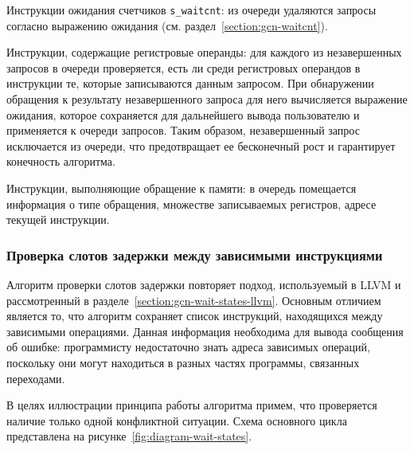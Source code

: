 \documentclass[a4paper,14pt]{extarticle}
\begin{document}
{\begin{ul}
\item Инструкции ожидания счетчиков \texttt{s\_waitcnt}: из очереди удаляются
  запросы согласно выражению ожидания (см. раздел~\ref{section:gcn-waitcnt}).
\item Инструкции, содержащие регистровые операнды: для каждого из незавершенных запросов
  в очереди проверяется, есть ли среди регистровых операндов в инструкции те,
  которые записываются данным запросом. При обнаружении обращения к результату незавершенного
  запроса для него вычисляется выражение ожидания, которое сохраняется для
  дальнейшего вывода пользователю и применяется к очереди запросов. Таким образом,
  незавершенный запрос исключается из очереди, что предотвращает ее бесконечный
  рост и гарантирует конечность алгоритма.
\item Инструкции, выполняющие обращение к памяти: в очередь помещается информация о
  типе обращения, множестве записываемых регистров, адресе текущей инструкции.
\end{ul}

\subsubsection{Проверка слотов задержки между зависимыми инструкциями}

Алгоритм проверки слотов задержки повторяет подход, используемый в LLVM и рассмотренный
в разделе~\ref{section:gcn-wait-states-llvm}. Основным отличием является то, что алгоритм
сохраняет список инструкций, находящихся между зависимыми операциями. Данная информация
необходима для вывода сообщения об ошибке: программисту недостаточно знать адреса
зависимых операций, поскольку они могут находиться в разных частях программы, связанных
переходами.

В целях иллюстрации принципа работы алгоритма примем, что проверяется наличие
только одной конфликтной ситуации. Схема основного цикла представлена
на рисунке~\ref{fig:diagram-wait-states}.

}
\end{document}
